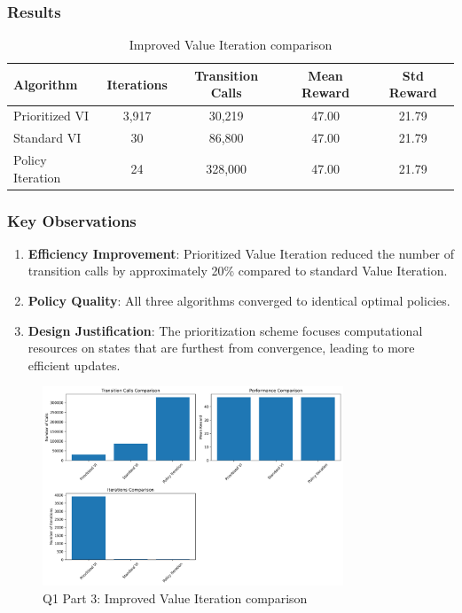 \documentclass[12pt]{article}
\begin{document}
\subsubsection{Results}

\begin{table}[H]
\centering
\caption{Improved Value Iteration comparison}
\begin{tabular}{lcccc}
\toprule
Algorithm & Iterations & Transition Calls & Mean Reward & Std Reward \\
\midrule
Prioritized VI & 3,917 & 30,219 & 47.00 & 21.79 \\
Standard VI & 30 & 86,800 & 47.00 & 21.79 \\
Policy Iteration & 24 & 328,000 & 47.00 & 21.79 \\
\bottomrule
\end{tabular}
\end{table}

\subsubsection{Key Observations}

\begin{enumerate}
    \item \textbf{Efficiency Improvement}: Prioritized Value Iteration reduced the number of transition calls by approximately 20\% compared to standard Value Iteration.
    
    \item \textbf{Policy Quality}: All three algorithms converged to identical optimal policies.
    
    \item \textbf{Design Justification}: The prioritization scheme focuses computational resources on states that are furthest from convergence, leading to more efficient updates.
\end{enumerate}

\begin{figure}[H]
\centering
\includegraphics[width=0.8\textwidth]{../Q1/part3/q1_part3_results.png}
\caption{Q1 Part 3: Improved Value Iteration comparison}
\end{figure}
\end{document}
